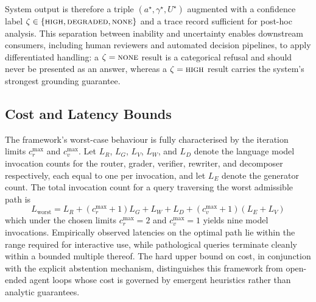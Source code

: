 System output is therefore a triple $(a^\star, \gamma^\star, U^\star)$
augmented with a confidence label
$\zeta \in \{\textsc{high}, \textsc{degraded}, \textsc{none}\}$ and a
trace record sufficient for post-hoc analysis. This separation between
inability and uncertainty enables downstream consumers, including human
reviewers and automated decision pipelines, to apply differentiated
handling: a $\zeta = \textsc{none}$ result is a categorical refusal and
should never be presented as an answer, whereas a $\zeta = \textsc{high}$
result carries the system's strongest grounding guarantee.

\subsection{Cost and Latency Bounds}
\label{sec:bounds}

The framework's worst-case behaviour is fully characterised by the
iteration limits $c_r^{\max}$ and $c_v^{\max}$. Let $L_R$, $L_G$,
$L_V$, $L_W$, and $L_D$ denote the language model invocation counts
for the router, grader, verifier, rewriter, and decomposer respectively,
each equal to one per invocation, and let $L_E$ denote the generator
count. The total invocation count for a query traversing the worst
admissible path is
\begin{equation}
L_{\text{worst}} = L_R + (c_r^{\max}+1) L_G + L_W + L_D + (c_v^{\max}+1)(L_E + L_V)
\end{equation}
which under the chosen limits $c_r^{\max}=2$ and $c_v^{\max}=1$ yields
nine model invocations. Empirically observed latencies on the optimal
path lie within the range required for interactive use, while pathological
queries terminate cleanly within a bounded multiple thereof. The hard
upper bound on cost, in conjunction with the explicit abstention
mechanism, distinguishes this framework from open-ended agent loops
whose cost is governed by emergent heuristics rather than analytic
guarantees.
